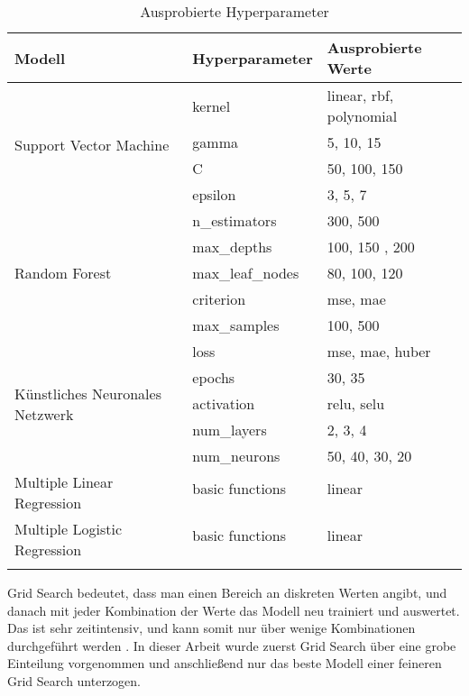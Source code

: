 \begin{table}[ht]
  \caption{\label{tab:hyperparameter} Ausprobierte Hyperparameter}
  \begin{tabular}{ p{4cm}  p{4cm}  p{5cm} }
    \toprule
    Modell & Hyperparameter  & Ausprobierte Werte \\
    \midrule
    \multirow{4}{7em}{Support Vector Machine} & kernel & linear, rbf, polynomial \\
    & gamma & 5, 10, 15 \\
    & C  & 50, 100, 150  \\
    & epsilon & 3, 5, 7  \\
    \midrule
    \multirow{5}{7em}{Random Forest} & n\_estimators & 300, 500 \\
    & max\_depths & 100, 150 , 200 \\
    & max\_leaf\_nodes & 80, 100, 120 \\
    & criterion & mse, mae \\
    & max\_samples & 100, 500 \\
    \midrule
    \multirow{5}{7em}{K\"unstliches Neuronales Netzwerk} & loss & mse, mae, huber \\
    & epochs & 30, 35 \\
    & activation & relu, selu \\
    & num\_layers & 2, 3, 4 \\
    & num\_neurons & 50, 40, 30, 20 \\
    \midrule
    \multirow{2}{7em}{Multiple Linear Regression} & basic functions & linear\\
    & & \\
    \midrule
    \multirow{2}{7em}{Multiple Logistic Regression} & basic functions & linear\\
    & & \\
    & & \\
    \bottomrule
    
  \end{tabular}
  
\end{table}

Grid Search bedeutet, dass man einen Bereich an diskreten Werten angibt, und danach mit jeder Kombination der Werte das Modell neu trainiert und auswertet.
Das ist sehr zeitintensiv, und kann somit nur \"uber wenige Kombinationen durchgef\"uhrt werden \cite[Seiten 76 bis 78]{handson}. In dieser Arbeit wurde zuerst Grid Search \"uber eine grobe Einteilung 
vorgenommen und anschlie{\ss}end nur das beste Modell einer feineren Grid Search unterzogen. \\




